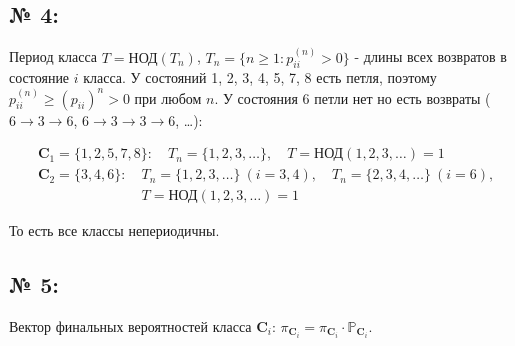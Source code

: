 \documentclass[12pt]{spbstu-task}
\begin{document}
\subsection*{№ 4:}
Период класса \(T = \text{НОД}(T_n)\), \(T_n = \{n \geq 1 : p^{(n)}_{ii} > 0\}\) -
длины всех возвратов в состояние \(i\) класса. У состояний 1, 2, 3, 4, 5, 7, 8 есть петля, 
поэтому \(p^{(n)}_{ii} \geq (p_{ii})^n > 0\) при любом \(n\). У состояния 6
петли нет но есть возвраты (\(6 \to 3 \to 6\), \(6 \to 3 \to 3 \to 6\), \dots):

\begin{displaymath}
  \begin{aligned}
    & \mathbf{C}_1 = \{1, 2, 5, 7, 8\}: \quad T_n = \{1, 2, 3, \ldots\}, \quad T = \text{НОД}(1, 2, 3, \ldots) = 1 \\
    & \mathbf{C}_2 = \{3, 4, 6\}: \quad T_n = \{1, 2, 3, \ldots\}\ (i = 3, 4), \quad T_n = \{2, 3, 4, \ldots\}\ (i = 6), \\
    & \phantom{\mathbf{C}_2 = \{3, 4, 6\}: \quad} T = \text{НОД}(1, 2, 3, \ldots) = 1
  \end{aligned}
\end{displaymath}

То есть все классы непериодичны.

\subsection*{№ 5:}
Вектор финальных вероятностей класса \(\mathbf{C}_i\):
\(\pi_{\mathbf{C}_i} =
\pi_{\mathbf{C}_i}\cdot\mathbb{P}_{\mathbf{C}_i}\).
\end{document}
